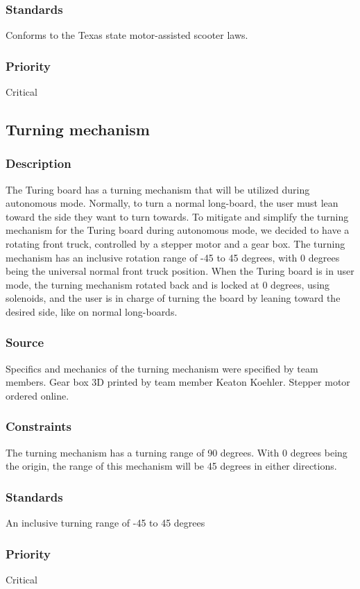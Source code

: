 \subsubsection{Standards}
Conforms to the Texas state motor-assisted scooter laws.
\subsubsection{Priority}
Critical
\subsection{Turning mechanism}
\subsubsection{Description}
The Turing board has a turning mechanism that will be utilized during autonomous mode. Normally, to turn a normal long-board, the user must lean toward the side they want to turn towards. To mitigate and simplify the turning mechanism for the Turing board during autonomous mode, we decided to have a rotating front truck, controlled by a stepper motor and a gear box. The turning mechanism has an inclusive rotation range of -45 to 45 degrees, with 0 degrees being the universal normal front truck position. When the Turing board is in user mode, the turning mechanism rotated back and is locked at 0 degrees, using solenoids, and the user is in charge of turning the board by leaning toward the desired side, like on normal long-boards. 
\subsubsection{Source}
Specifics and mechanics of the turning mechanism were specified by team members.\hfill \break
Gear box 3D printed by team member Keaton Koehler.\hfill \break
Stepper motor ordered online.
\subsubsection{Constraints}
The turning mechanism has a turning range of 90 degrees. With 0 degrees being the origin, the range of this mechanism will be 45 degrees in either directions.
\subsubsection{Standards}
An inclusive turning range of -45 to 45 degrees
\subsubsection{Priority}
Critical
